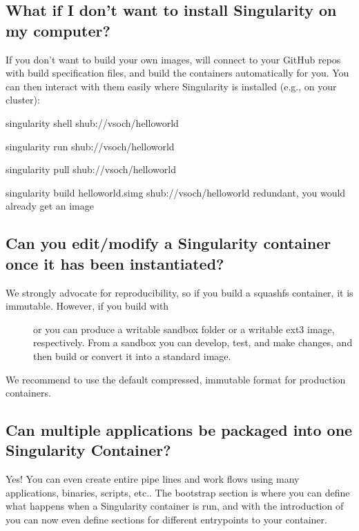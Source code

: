 \documentclass[letterpaper,10pt,english]{sphinxmanual}
\begin{document}
\subsection{What if I don’t want to install Singularity on my computer?}
\label{\detokenize{faq:what-if-i-don-t-want-to-install-singularity-on-my-computer}}
If you don’t want to build your own images,  will connect to your GitHub repos with build specification files, and build the containers automatically for you.
You can then interact with them easily where Singularity is installed (e.g., on your cluster):

%
\begin{sphinxVerbatim}[commandchars=\\\{\}]
singularity shell shub://vsoch/hello\PYGZhy{}world

singularity run shub://vsoch/hello\PYGZhy{}world

singularity pull shub://vsoch/hello\PYGZhy{}world

singularity build hello\PYGZhy{}world.simg shub://vsoch/hello\PYGZhy{}world \PYGZsh{} redundant, you would already get an image
\end{sphinxVerbatim}


\subsection{Can you edit/modify a Singularity container once it has been instantiated?}
\label{\detokenize{faq:can-you-edit-modify-a-singularity-container-once-it-has-been-instantiated}}\begin{description}
\item[{We strongly advocate for reproducibility, so if you build a squashfs container, it is immutable. However, if you build with}] \leavevmode
{} or  you can produce a writable sandbox folder or a writable ext3 image, respectively.
From a sandbox you can develop, test, and make changes, and then build or convert it into a standard image.

\end{description}

We recommend to use the default compressed, immutable format for production containers.


\subsection{Can multiple applications be packaged into one Singularity Container?}
\label{\detokenize{faq:can-multiple-applications-be-packaged-into-one-singularity-container}}
Yes! You can even create entire pipe lines and work flows using many applications, binaries, scripts, etc..
The  bootstrap section is where you can define what happens when a Singularity container is run,
and with the introduction of {\hyperref[\detokenize{reproducible_scif_apps:reproducible-scif-apps}]{}}  you can now even define  sections for different entrypoints to your container.
\end{document}

